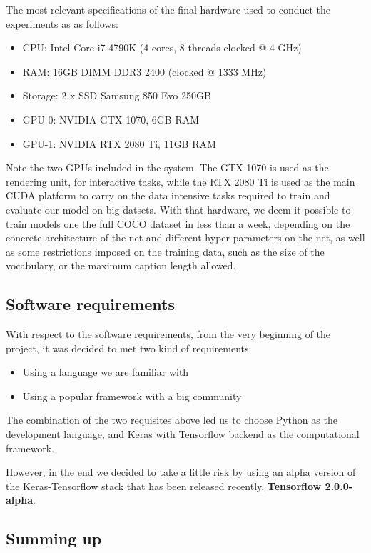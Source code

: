 The most relevant specifications of the final hardware used to conduct the experiments as as follows:

\begin{itemize}
\item CPU: Intel Core i7-4790K (4 cores, 8 threads clocked @ 4 GHz)
\item RAM: 16GB DIMM DDR3 2400 (clocked @ 1333 MHz)
\item Storage: 2 x SSD Samsung 850 Evo 250GB
\item GPU-0: NVIDIA GTX 1070, 6GB RAM
\item GPU-1: NVIDIA RTX 2080 Ti, 11GB RAM
\end{itemize}

Note the two GPUs included in the system. The GTX 1070 is used as the rendering unit, for interactive tasks, while the RTX 2080 Ti is used as the main CUDA platform to carry on the data intensive tasks required to train and evaluate our model on big datsets. With that hardware, we deem it possible to train models one the full COCO dataset in less than a week, depending on the concrete architecture of the net and different hyper parameters on the net, as well as some restrictions imposed on the training data, such as the size of the vocabulary, or the maximum caption length allowed.

\subsection{Software requirements}

With respect to the software requirements, from the very beginning of the project, it was decided to met two kind of requirements:
\begin{itemize}
    \item Using a language we are familiar with
    \item Using a popular framework with a big community 
\end{itemize}

The combination of the two requisites above led us to choose Python as the development language, and Keras with Tensorflow backend as the computational framework. 

However, in the end we decided to take a little risk by using an alpha version of the Keras-Tensorflow stack that has been released recently, \textbf{Tensorflow 2.0.0-alpha}.

\subsection{Summing up}

